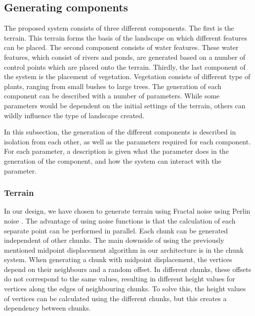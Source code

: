 \subsection{Generating components} \label{sec:architecture-singlecomponent}
The proposed system consists of three different components. The first is the terrain. This terrain forms the basis of the landscape on which different features can be placed. The second component consists of water features. These water features, which consist of rivers and ponds, are generated based on a number of control points which are placed onto the terrain. Thirdly, the last component of the system is the placement of vegetation. Vegetation consists of different type of plants, ranging from small bushes to large trees. The generation of each component can be described with a number of parameters. While some parameters would be dependent on the initial settings of the terrain, others can wildly influence the type of landscape created.

In this subsection, the generation of the different components is described in isolation from each other, as well as the parameters required for each component. For each parameter, a description is given what the parameter does in the generation of the component, and how the system can interact with the parameter.

\subsubsection{Terrain} 
In our design, we have chosen to generate terrain using Fractal noise using Perlin noise \cite{musgrave_synthesis_1989}. The advantage of using noise functions is that the calculation of each separate point can be performed in parallel. Each chunk can be generated independent of other chunks.
The main downside of using the previously mentioned midpoint displacement algorithm in our architecture is in the chunk system. When generating a chunk with midpoint displacement, the vertices depend on their neighbours and a random offset. In different chunks, these offsets do not correspond to the same values, resulting in different height values for vertices along the edges of neighbouring chunks. To solve this, the height values of vertices can be calculated using the different chunks, but this creates a dependency between chunks.

